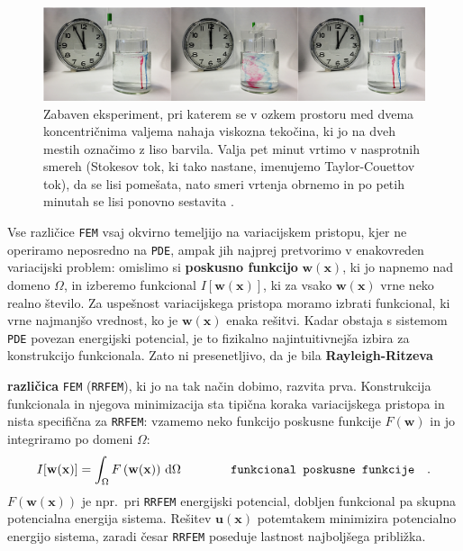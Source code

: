 \begin{figure}[ht]
	\includegraphics[width = 1\textwidth]{Slike/TaylorCouette}
	\caption{Zabaven eksperiment, pri katerem se v ozkem prostoru med dvema koncentričnima valjema nahaja viskozna tekočina, ki jo na dveh mestih označimo z liso barvila. Valja pet minut vrtimo v nasprotnih smereh (Stokesov tok, ki tako nastane, imenujemo Taylor-Couettov tok), da se lisi pomešata, nato smeri vrtenja obrnemo in po petih minutah se lisi ponovno sestavita \cite{Wiki-StokesFlow}.}
	\label{fig:TaylorCouette}
\end{figure}

\parbox{\textwidth}{Vse različice \texttt{FEM} vsaj okvirno temeljijo na variacijskem pristopu, kjer ne operiramo neposredno na \texttt{PDE}, ampak jih najprej pretvorimo v enakovreden variacijski problem: omislimo si \textbf{poskusno funkcijo} $\mathbf{w}(\mathbf{x})$, ki jo napnemo nad domeno $\Omega$, in izberemo funkcional $I[\mathbf{w}(\mathbf{x})]$, ki za vsako $\mathbf{w}(\mathbf{x})$ vrne neko realno število. Za uspešnost variacijskega pristopa moramo izbrati funkcional, ki vrne najmanjšo vrednost, ko je $\mathbf{w}(\mathbf{x})$ enaka rešitvi. Kadar obstaja s sistemom \texttt{PDE} povezan energijski potencial, je to fizikalno najintuitivnejša izbira za konstrukcijo funkcionala. Zato ni presenetljivo, da je bila \textbf{Rayleigh-Ritzeva} \parfillskip=0pt}

\setlength{\textheight}{26.5cm}
\pagebreak
\setlength{\topmargin}{1.6cm}			%
\setlength{\headheight}{0.0cm}
\setlength{\headsep}{0.0cm}			%
\fancyhf{}
\fancyfoot[C]{\thepage}

\textbf{različica} \texttt{FEM} (\texttt{RRFEM}), ki jo na tak način dobimo, razvita prva. Konstrukcija funkcionala in njegova minimizacija sta tipična koraka variacijskega pristopa in nista specifična za \texttt{RRFEM}: vzamemo neko funkcijo poskusne funkcije $F\left(\mathbf{w}\right)$ in jo integriramo po domeni $\Omega$:
\begin{equation}
	I[\mathbf{w}(\mathbf{x})] = \int_{\Omega} F\left(\mathbf{w}(\mathbf{x})\right) \, \mathrm{d} \Omega \hspace{1.4cm} \texttt{funkcional poskusne funkcije} \quad .
	\label{eq:GeneralFunctional}
\end{equation}
$F\left(\mathbf{w}(\mathbf{x})\right)$ je npr.\ pri \texttt{RRFEM} energijski potencial, dobljen funkcional pa skupna potencialna energija sistema. Rešitev $\mathbf{u}(\mathbf{x})$ potemtakem minimizira potencialno energijo sistema, zaradi česar \texttt{RRFEM} poseduje last\-nost najboljšega približka. 

